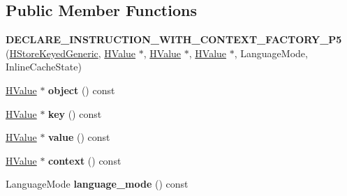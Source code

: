 \subsection*{Public Member Functions}
\begin{DoxyCompactItemize}
\item 
{\bfseries D\+E\+C\+L\+A\+R\+E\+\_\+\+I\+N\+S\+T\+R\+U\+C\+T\+I\+O\+N\+\_\+\+W\+I\+T\+H\+\_\+\+C\+O\+N\+T\+E\+X\+T\+\_\+\+F\+A\+C\+T\+O\+R\+Y\+\_\+\+P5} (\hyperlink{classv8_1_1internal_1_1_h_store_keyed_generic}{H\+Store\+Keyed\+Generic}, \hyperlink{classv8_1_1internal_1_1_h_value}{H\+Value} $\ast$, \hyperlink{classv8_1_1internal_1_1_h_value}{H\+Value} $\ast$, \hyperlink{classv8_1_1internal_1_1_h_value}{H\+Value} $\ast$, Language\+Mode, Inline\+Cache\+State)\hypertarget{classv8_1_1internal_1_1_h_store_keyed_generic_acbacb7cf7f6233794e2753fbf25fc92f}{}\label{classv8_1_1internal_1_1_h_store_keyed_generic_acbacb7cf7f6233794e2753fbf25fc92f}

\item 
\hyperlink{classv8_1_1internal_1_1_h_value}{H\+Value} $\ast$ {\bfseries object} () const \hypertarget{classv8_1_1internal_1_1_h_store_keyed_generic_a2700764cfaeda50be7ddafd68395d26a}{}\label{classv8_1_1internal_1_1_h_store_keyed_generic_a2700764cfaeda50be7ddafd68395d26a}

\item 
\hyperlink{classv8_1_1internal_1_1_h_value}{H\+Value} $\ast$ {\bfseries key} () const \hypertarget{classv8_1_1internal_1_1_h_store_keyed_generic_a158bd70a2ca27d60b06fd82f88b33d29}{}\label{classv8_1_1internal_1_1_h_store_keyed_generic_a158bd70a2ca27d60b06fd82f88b33d29}

\item 
\hyperlink{classv8_1_1internal_1_1_h_value}{H\+Value} $\ast$ {\bfseries value} () const \hypertarget{classv8_1_1internal_1_1_h_store_keyed_generic_a0561e9e60cb4c224fb424d4665ecfdaa}{}\label{classv8_1_1internal_1_1_h_store_keyed_generic_a0561e9e60cb4c224fb424d4665ecfdaa}

\item 
\hyperlink{classv8_1_1internal_1_1_h_value}{H\+Value} $\ast$ {\bfseries context} () const \hypertarget{classv8_1_1internal_1_1_h_store_keyed_generic_a416b09eededb0850a7b073d4fe3cae35}{}\label{classv8_1_1internal_1_1_h_store_keyed_generic_a416b09eededb0850a7b073d4fe3cae35}

\item 
Language\+Mode {\bfseries language\+\_\+mode} () const \hypertarget{classv8_1_1internal_1_1_h_store_keyed_generic_ad4dd048ac0fabd310a01e45c02fc2d91}{}\label{classv8_1_1internal_1_1_h_store_keyed_generic_ad4dd048ac0fabd310a01e45c02fc2d91}


\end{DoxyCompactItemize}
